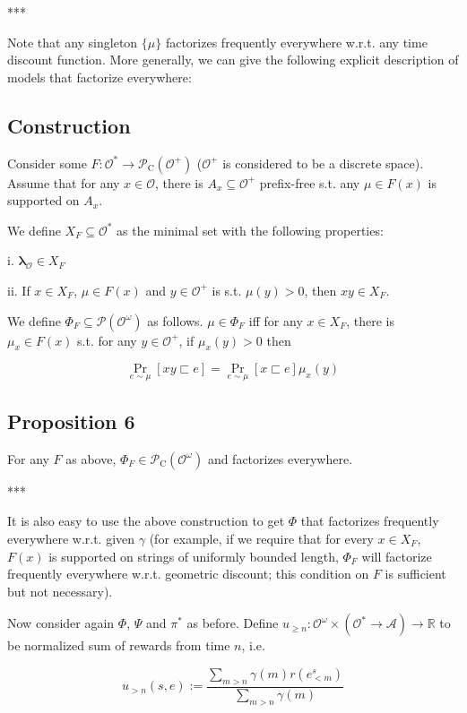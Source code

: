 \documentclass[a4paper]{article}
\DeclareMathOperator{\Prb}{Pr}
\newcommand{\Reals}{\mathbb{R}}
\newcommand{\Estr}{\bm{\lambda}}
\newcommand{\Prob}{\mathcal{P}}
\newcommand{\Act}{\mathcal{A}}
\newcommand{\Obs}{\mathcal{O}}
\newcommand{\ObsO}{\Obs^\omega}
\newcommand{\Pol}{\Obs^* \rightarrow \Act}
\newcommand{\CC}{\mathcal{P}_{\operatorname{C}}}
\begin{document}
***

Note that any singleton ${\{\mu\}}$ factorizes frequently everywhere w.r.t. any time discount function. More generally, we can give the following explicit description of models that factorize everywhere:

\subsection{Construction}

Consider some ${F: \Obs^* \rightarrow \CC(\Obs^+)}$ (${\Obs^+}$ is considered to be a discrete space). Assume that for any ${x \in \Obs}$, there is ${A_x \subseteq \Obs^+}$ prefix-free s.t. any ${\mu \in F(x)}$ is supported on ${A_x}$.

We define ${X_F \subseteq \Obs^*}$ as the minimal set with the following properties:

i. ${\Estr_\Obs \in X_F}$

ii. If ${x \in X_F}$, ${\mu \in F(x)}$ and ${y \in \Obs^+}$ is s.t. ${\mu(y) > 0}$, then ${xy \in X_F}$.

We define ${\Phi_F \subseteq \Prob(\ObsO)}$ as follows. ${\mu \in \Phi_F}$ iff for any ${x \in X_F}$, there is ${\mu_x \in F(x)}$ s.t. for any ${y \in \Obs^+}$, if ${\mu_x(y) > 0}$ then

$$\Prb_{e \sim \mu}[xy \sqsubset e] = \Prb_{e \sim \mu}[x \sqsubset e] \mu_x(y)$$

\subsection{Proposition 6}

For any ${F}$ as above, ${\Phi_F \in \CC(\ObsO)}$ and factorizes everywhere.

***

It is also easy to use the above construction to get ${\Phi}$ that factorizes frequently everywhere w.r.t. given ${\gamma}$ (for example, if we require that for every ${x \in X_F}$, ${F(x)}$ is supported on strings of uniformly bounded length, ${\Phi_F}$ will factorize frequently everywhere w.r.t. geometric discount; this condition on ${F}$ is sufficient but not necessary).

Now consider again ${\Phi}$, ${\Psi}$ and ${\pi^*}$ as before. Define ${u_{\geq n}: \ObsO \times (\Pol) \rightarrow \Reals}$ to be normalized sum of rewards from time ${n}$, i.e.

$$u_{> n}(s,e):=\frac{\sum_{m > n} \gamma(m)r(e^s_{<m})}{\sum_{m > n} \gamma(m)}$$
\end{document}
